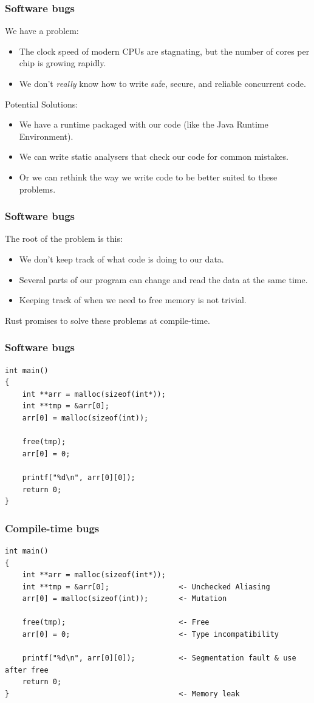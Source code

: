\documentclass{slides}
\begin{document}
\begin{frame}
\frametitle{Software bugs}
We have a problem:
\begin{itemize}
    \item The clock speed of modern CPUs are stagnating, but the number of cores per chip is growing rapidly.
    \item We don't \textit{really} know how to write safe, secure, and reliable concurrent code.
\end{itemize}
Potential Solutions:
\begin{itemize}
    \item We have a runtime packaged with our code (like the Java Runtime Environment).
    \item We can write static analysers that check our code for common mistakes.
    \item Or we can rethink the way we write code to be better suited to these problems.
\end{itemize}
\end{frame}

\begin{frame}
\frametitle{Software bugs}
The root of the problem is this:
\begin{itemize}
    \item We don't keep track of what code is doing to our data.
    \item Several parts of our program can change and read the data at the same time.
    \item Keeping track of when we need to free memory is not trivial.
\end{itemize}
Rust promises to solve these problems at compile-time.
\end{frame}

\begin{frame}[fragile]
\frametitle{Software bugs}
\begin{verbatim}
int main()
{
    int **arr = malloc(sizeof(int*));
    int **tmp = &arr[0];
    arr[0] = malloc(sizeof(int));
    
    free(tmp);
    arr[0] = 0;
    
    printf("%d\n", arr[0][0]);
    return 0;
}
\end{verbatim}
\end{frame}

\begin{frame}[fragile]
\frametitle{Compile-time bugs}
\begin{verbatim}
int main()
{
    int **arr = malloc(sizeof(int*));
    int **tmp = &arr[0];                <- Unchecked Aliasing
    arr[0] = malloc(sizeof(int));       <- Mutation
    
    free(tmp);                          <- Free
    arr[0] = 0;                         <- Type incompatibility 
    
    printf("%d\n", arr[0][0]);          <- Segmentation fault & use after free
    return 0;
}                                       <- Memory leak
\end{verbatim}
\end{frame}
\end{document}
